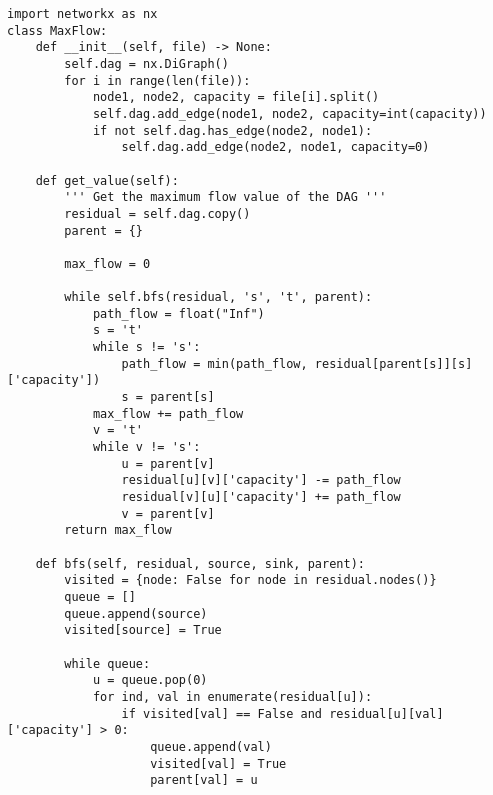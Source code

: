 \documentclass[addpoints]{exam}
\begin{document}
\begin{questions}
  \newpage
  \begin{solution}
    \begin{lstlisting}
import networkx as nx
class MaxFlow:
    def __init__(self, file) -> None:
        self.dag = nx.DiGraph()
        for i in range(len(file)):
            node1, node2, capacity = file[i].split()
            self.dag.add_edge(node1, node2, capacity=int(capacity))
            if not self.dag.has_edge(node2, node1):
                self.dag.add_edge(node2, node1, capacity=0)
    
    def get_value(self):
        ''' Get the maximum flow value of the DAG '''
        residual = self.dag.copy()
        parent = {}

        max_flow = 0

        while self.bfs(residual, 's', 't', parent):
            path_flow = float("Inf")
            s = 't'
            while s != 's':
                path_flow = min(path_flow, residual[parent[s]][s]['capacity'])
                s = parent[s]
            max_flow += path_flow
            v = 't'
            while v != 's':
                u = parent[v]
                residual[u][v]['capacity'] -= path_flow
                residual[v][u]['capacity'] += path_flow
                v = parent[v]
        return max_flow

    def bfs(self, residual, source, sink, parent):
        visited = {node: False for node in residual.nodes()}
        queue = []
        queue.append(source)
        visited[source] = True

        while queue:
            u = queue.pop(0)
            for ind, val in enumerate(residual[u]):
                if visited[val] == False and residual[u][val]['capacity'] > 0:
                    queue.append(val)
                    visited[val] = True
                    parent[val] = u


\end{lstlisting}
\end{solution}
\end{questions}
\end{document}
